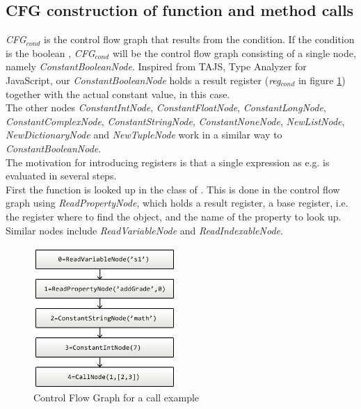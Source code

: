 \subsection{CFG construction of function and method calls}
\textit{CFG$_{\textit{cond}}$} is the control flow graph that results from the condition. If the condition is the boolean , \textit{CFG$_{\textit{cond}}$} will be the control flow graph consisting of a single node, namely \textit{ConstantBooleanNode}. Inspired from TAJS, Type Analyzer for JavaScript, our \textit{ConstantBooleanNode} holds a result register (\textit{reg$_{\textit{cond}}$} in figure \ref{fig:callCfg}) together with the actual constant value,  in this case. \\
The other nodes \textit{ConstantIntNode}, \textit{ConstantFloatNode}, \textit{ConstantLongNode}, \textit{ConstantComplexNode}, \textit{ConstantStringNode}, \textit{ConstantNoneNode}, \textit{NewListNode}, \textit{NewDictionaryNode} and \textit{NewTupleNode} work in a similar way to \textit{ConstantBooleanNode}. \\
The motivation for introducing registers is that a single expression as e.g.  is evaluated in several steps. \\
First the function  is looked up in the class of . This is done in the control flow graph using \textit{ReadPropertyNode}, which holds a result register, a base register, i.e. the register where to find the object, and the name of the property to look up. Similar nodes include \textit{ReadVariableNode} and \textit{ReadIndexableNode}. \\
\begin{figure}
	\vspace{-20pt}
	\begin{center}
		\includegraphics[width=0.48\textwidth]{images/Call-example.png}
	\end{center}
	\vspace{-10pt}
	\caption{Control Flow Graph for a call example}
	\label{fig:callCfg}
	\vspace{-10pt}
\end{figure}
